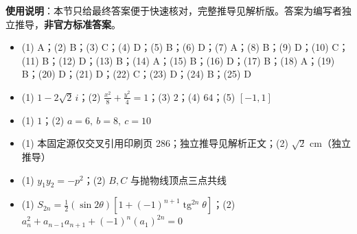 
\begin{gknotice}
\textbf{使用说明}：本节只给最终答案便于快速核对，完整推导见解析版。答案为编写者独立推导，\textbf{非官方标准答案}。
\end{gknotice}

\begin{itemize}[leftmargin=2.6em]
  \item[\textbf{1.}] (1) A；(2) B；(3) C；(4) D；(5) B；(6) D；(7) A；(8) B；(9) D；(10) C；(11) B；(12) D；(13) B；(14) A；(15) B；(16) D；(17) B；(18) A；(19) B；(20) D；(21) D；(22) C；(23) D；(24) B；(25) D
  \item[\textbf{2.}] (1) $1-2\sqrt2\,i$；(2) $\displaystyle\frac{x^2}{8}+\frac{y^2}{4}=1$；(3) $2$；(4) $64$；(5) $[-1,1]$
  \item[\textbf{3.}] (1) $1$；(2) $a=6,\ b=8,\ c=10$
  \item[\textbf{4.}] (1) 本固定源仅交叉引用印刷页 286；独立推导见解析正文；(2) $\sqrt2\text{ cm}$（独立推导）
  \item[\textbf{5.}] (1) $y_1y_2=-p^2$；(2) $B,C$ 与抛物线顶点三点共线
  \item[\textbf{6.}] (1) $\displaystyle S_{2n}=\frac12(\sin2\theta)\left[1+(-1)^{n+1}\operatorname{tg}^{2n}\theta\right]$；(2) $\displaystyle a_n^2+a_{n-1}a_{n+1}+(-1)^n(a_1)^{2n}=0$
\end{itemize}
